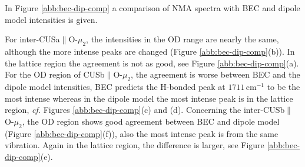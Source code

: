 \documentclass[11pt,DIV=13,BCOR=5mm,a4paper,headinclude]{scrbook}
\begin{document}
In Figure \ref{abb:bec-dip-comp} a comparison of NMA spectra with BEC and dipole model intensities is given.

For inter-CUSa$\parallel$O-$\mu_2$, the intensities in the OD range are nearly the same, although the more intense peaks are changed (Figure \ref{abb:bec-dip-comp}(b)).
In the lattice region the agreement is not as good, see Figure \ref{abb:bec-dip-comp}(a).
For the OD region of CUSb$\parallel$O-$\mu_2$, the agreement is worse between BEC and the dipole model intensities, BEC predicts the H-bonded peak at $1711\,$cm$^{-1}$ to be the most intense whereas in the dipole model the most intense peak is in the lattice region, \textit{cf.} Figures \ref{abb:bec-dip-comp}(c) and (d). %
Concerning the inter-CUSb$\parallel$O-$\mu_2$, the OD region shows good agreement between BEC and dipole model (Figure \ref{abb:bec-dip-comp}(f)), also the most intense peak is from the same vibration.
Again in the lattice region, the difference is larger, see Figure \ref{abb:bec-dip-comp}(e).
\end{document}
